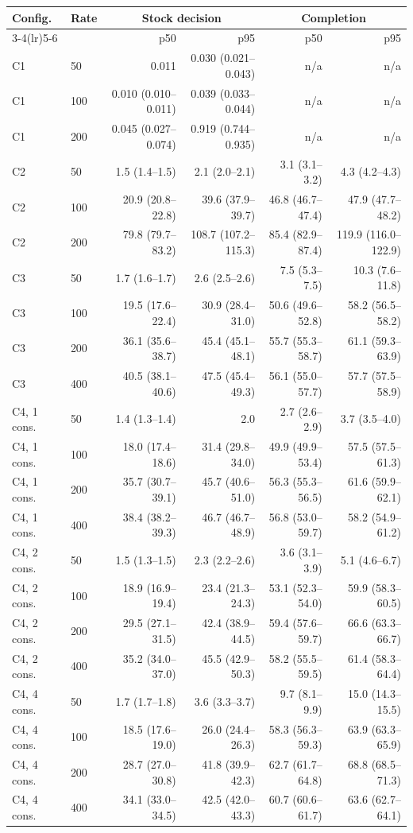 \begin{tabular}{llrrrr}
\toprule
Config. & Rate & \multicolumn{2}{c}{Stock decision} & \multicolumn{2}{c}{Completion} \\ \cmidrule(lr){3-4}\cmidrule(lr){5-6}
 & & p50 & p95 & p50 & p95 \\
\midrule
C1 & 50 & 0.011 & 0.030 (0.021--0.043) & n/a & n/a \\
C1 & 100 & 0.010 (0.010--0.011) & 0.039 (0.033--0.044) & n/a & n/a \\
C1 & 200 & 0.045 (0.027--0.074) & 0.919 (0.744--0.935) & n/a & n/a \\
\addlinespace[2pt]
C2 & 50 & 1.5 (1.4--1.5) & 2.1 (2.0--2.1) & 3.1 (3.1--3.2) & 4.3 (4.2--4.3) \\
C2 & 100 & 20.9 (20.8--22.8) & 39.6 (37.9--39.7) & 46.8 (46.7--47.4) & 47.9 (47.7--48.2) \\
C2 & 200 & 79.8 (79.7--83.2) & 108.7 (107.2--115.3) & 85.4 (82.9--87.4) & 119.9 (116.0--122.9) \\
\addlinespace[2pt]
C3 & 50 & 1.7 (1.6--1.7) & 2.6 (2.5--2.6) & 7.5 (5.3--7.5) & 10.3 (7.6--11.8) \\
C3 & 100 & 19.5 (17.6--22.4) & 30.9 (28.4--31.0) & 50.6 (49.6--52.8) & 58.2 (56.5--58.2) \\
C3 & 200 & 36.1 (35.6--38.7) & 45.4 (45.1--48.1) & 55.7 (55.3--58.7) & 61.1 (59.3--63.9) \\
C3 & 400 & 40.5 (38.1--40.6) & 47.5 (45.4--49.3) & 56.1 (55.0--57.7) & 57.7 (57.5--58.9) \\
\addlinespace[2pt]
C4, 1 cons. & 50 & 1.4 (1.3--1.4) & 2.0 & 2.7 (2.6--2.9) & 3.7 (3.5--4.0) \\
C4, 1 cons. & 100 & 18.0 (17.4--18.6) & 31.4 (29.8--34.0) & 49.9 (49.9--53.4) & 57.5 (57.5--61.3) \\
C4, 1 cons. & 200 & 35.7 (30.7--39.1) & 45.7 (40.6--51.0) & 56.3 (55.3--56.5) & 61.6 (59.9--62.1) \\
C4, 1 cons. & 400 & 38.4 (38.2--39.3) & 46.7 (46.7--48.9) & 56.8 (53.0--59.7) & 58.2 (54.9--61.2) \\
\addlinespace[2pt]
C4, 2 cons. & 50 & 1.5 (1.3--1.5) & 2.3 (2.2--2.6) & 3.6 (3.1--3.9) & 5.1 (4.6--6.7) \\
C4, 2 cons. & 100 & 18.9 (16.9--19.4) & 23.4 (21.3--24.3) & 53.1 (52.3--54.0) & 59.9 (58.3--60.5) \\
C4, 2 cons. & 200 & 29.5 (27.1--31.5) & 42.4 (38.9--44.5) & 59.4 (57.6--59.7) & 66.6 (63.3--66.7) \\
C4, 2 cons. & 400 & 35.2 (34.0--37.0) & 45.5 (42.9--50.3) & 58.2 (55.5--59.5) & 61.4 (58.3--64.4) \\
\addlinespace[2pt]
C4, 4 cons. & 50 & 1.7 (1.7--1.8) & 3.6 (3.3--3.7) & 9.7 (8.1--9.9) & 15.0 (14.3--15.5) \\
C4, 4 cons. & 100 & 18.5 (17.6--19.0) & 26.0 (24.4--26.3) & 58.3 (56.3--59.3) & 63.9 (63.3--65.9) \\
C4, 4 cons. & 200 & 28.7 (27.0--30.8) & 41.8 (39.9--42.3) & 62.7 (61.7--64.8) & 68.8 (68.5--71.3) \\
C4, 4 cons. & 400 & 34.1 (33.0--34.5) & 42.5 (42.0--43.3) & 60.7 (60.6--61.7) & 63.6 (62.7--64.1) \\
\bottomrule
\end{tabular}
